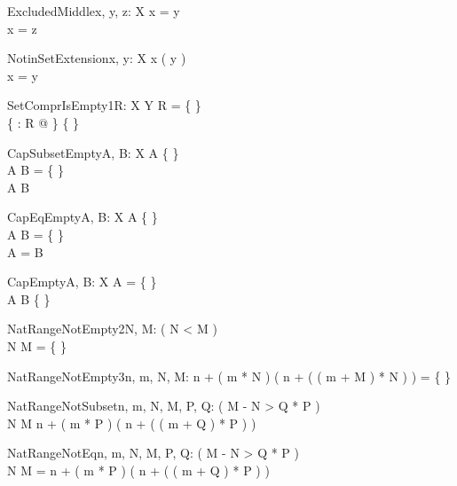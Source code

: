 \begin{theorem}{ExcludedMiddle}{x, \const y, \const z: X}
x = y \\
x = z
\end{theorem}

\begin{theorem}{NotinSetExtension}{x, \const y: X}
x \notin \se( y ) \\
x = y
\end{theorem}


\begin{theorem}{SetComprIsEmpty1}{R: X \rel Y}
R = \{ \} \\
\{ \anything : \dom R @ \anything \} \neq \{ \}
\end{theorem}

\begin{theorem}{CapSubsetEmpty}{A, B: \power X}
A \neq \{ \} \\
A \cap B = \{ \} \\
A \subset B
\end{theorem}

\begin{theorem}{CapEqEmpty}{A, B: \power X}
A \neq \{ \} \\
A \cap B = \{ \} \\
A = B
\end{theorem}

\begin{theorem}{CapEmpty}{A, B: \power X}
A = \{ \} \\
A \cap B \neq \{ \}
\end{theorem}

\begin{theorem}{NatRangeNotEmpty2}{\const N, \const M: \nat}
\eval( N < M ) \\
N \upto M = \{ \}
\end{theorem}

\begin{theorem}{NatRangeNotEmpty3}{n, m, \const N, \const M: \nat}
n + ( m * N ) \upto ( n + ( ( m + M ) * N ) ) = \{ \}
\end{theorem}

\begin{theorem}{NatRangeNotSubset}{n, m, \const N, \const M, \const P, \const Q: \nat}
\eval( M - N > Q * P ) \\
N \upto M \subset n + ( m * P ) \upto ( n + ( ( m + Q ) * P ) )
\end{theorem}

\begin{theorem}{NatRangeNotEq}{n, m, \const N, \const M, \const P, \const Q: \nat}
\eval( M - N > Q * P ) \\
N \upto M = n + ( m * P ) \upto ( n + ( ( m + Q ) * P ) )
\end{theorem}

